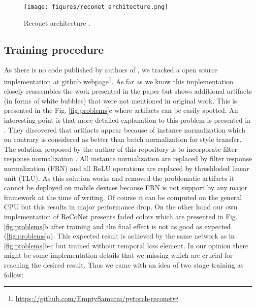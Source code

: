 \documentclass[a4paper,conference]{IEEEtran}
\begin{document}
\begin{figure*}[ht]
\caption{Reconet architecture \cite{Reconet}.}
\label{networkArchitecture}
\centering
\texttt{[image: figures/reconet\_architecture.png]}
\end{figure*}



\subsection{Training procedure}

As there is no code published by authors of \cite{Reconet}, we tracked a open source implementation at github webpage\footnote{\url{https://github.com/EmptySamurai/pytorch-reconet}}. As far as we know this implementation closely reassembles the work presented in the paper but shows additional artifacts (in forms of white bubbles) that were not mentioned in original work. This is presented in the Fig. \ref{fig:problems}c where artifacts can be easily spotted. An interesting point is that more detailed explanation to this problem is presented in \cite{karras2019analyzing}. They discovered that artifacts appear because of instance normalization which on contrary is considered as better than batch normalization \cite{instanceNormalization} for style transfer. The solution proposed by the author of this repository is to incorporate filter response normalization \cite{FRNlayer}. All instance normalization are replaced by filter response normalization (FRN) and all ReLU operations are replaced by threshloded linear unit (TLU). As this solution works and removed the problematic artifacts it cannot be deployed on mobile devices because FRN is not support by any major framework at the time of writing. Of course it can be computed on the general CPU but this results in major performance drop. On the other hand our own implementation of ReCoNet presents faded colors which are presented in Fig. \ref{fig:problems}b  after training and the final effect is not as good as expected (\ref{fig:problems}a). This expected result is achieved by the same network as in \ref{fig:problems}b-c but trained without temporal loss element. In our opinion there might be some implementation details that we missing which are crucial for reaching the desired result. Thus we came with an idea of two stage training as follow:
\end{document}
